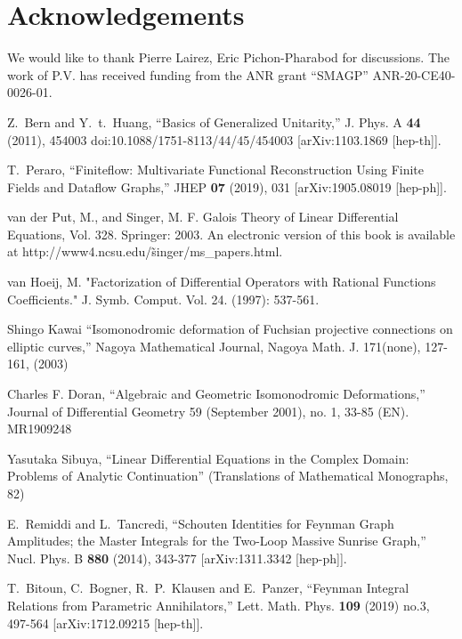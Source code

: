\documentclass[a4paper,12pt]{article}
\numberwithin{equation}{section}
\numberwithin{figure}{section}
\begin{document}
\section*{Acknowledgements}
We would like to thank Pierre Lairez, Eric Pichon-Pharabod  for discussions.
The work of P.V. has received funding from the ANR grant ``SMAGP''
ANR-20-CE40-0026-01.

\begin{thebibliography}{99}

Z.~Bern and Y.~t.~Huang,
``Basics of Generalized Unitarity,''
J. Phys. A \textbf{44} (2011), 454003
doi:10.1088/1751-8113/44/45/454003
[arXiv:1103.1869 [hep-th]].
  
T.~Peraro,
``Finiteflow: Multivariate Functional Reconstruction Using Finite Fields and Dataflow Graphs,''
JHEP \textbf{07} (2019), 031
[arXiv:1905.08019 [hep-ph]].

  
 van der Put, M., and Singer, M. F. Galois Theory of Linear Differential Equations, Vol. 328. Springer: 2003. An electronic version of this book is available at http://www4.ncsu.edu/\~singer/ms\_papers.html.

  van Hoeij, M. "Factorization of Differential Operators with Rational Functions Coefficients." J. Symb. Comput. Vol. 24. (1997): 537-561.

  
 Shingo Kawai ``Isomonodromic deformation of Fuchsian projective connections on elliptic curves,'' Nagoya Mathematical Journal, Nagoya Math. J. 171(none), 127-161, (2003)
  
 Charles F. Doran, ``Algebraic and Geometric Isomonodromic Deformations,'' Journal of Differential Geometry 59 (September 2001), no. 1, 33-85 (EN). MR1909248
   
   Yasutaka Sibuya, ``Linear Differential Equations in the Complex Domain: Problems of Analytic Continuation'' (Translations of Mathematical Monographs, 82)

E.~Remiddi and L.~Tancredi,
``Schouten Identities for Feynman Graph Amplitudes; the Master Integrals for the Two-Loop Massive Sunrise Graph,''
Nucl. Phys. B \textbf{880} (2014), 343-377
[arXiv:1311.3342 [hep-ph]].

  
T.~Bitoun, C.~Bogner, R.~P.~Klausen and E.~Panzer,
``Feynman Integral Relations from Parametric Annihilators,''
Lett. Math. Phys. \textbf{109} (2019) no.3, 497-564
[arXiv:1712.09215 [hep-th]].


\end{thebibliography}
\end{document}
